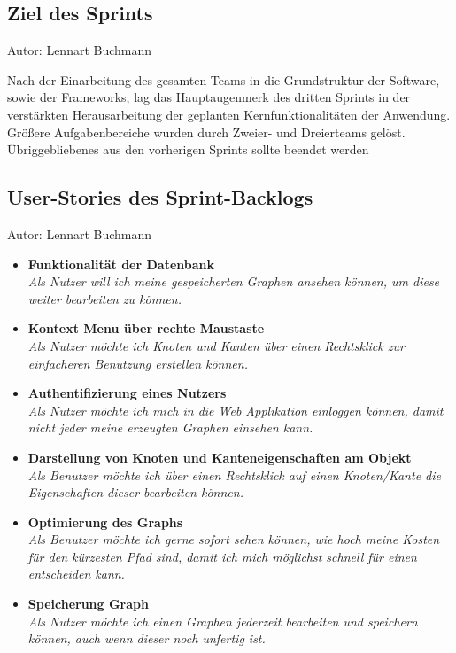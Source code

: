 
\subsection{Ziel des Sprints}
{\small Autor: Lennart Buchmann}

Nach der Einarbeitung des gesamten Teams in die Grundstruktur der Software, sowie der Frameworks, lag das Hauptaugenmerk des 
dritten Sprints in der verstärkten Herausarbeitung der geplanten Kernfunktionalitäten der Anwendung. Größere Aufgabenbereiche wurden 
durch Zweier- und Dreierteams gelöst. Übriggebliebenes aus den vorherigen Sprints sollte beendet werden 

\subsection{User-Stories des Sprint-Backlogs}
{\small Autor: Lennart Buchmann}

\begin{itemize}

  \item \textbf{Funktionalität der Datenbank}
        \\\textit{Als Nutzer will ich meine gespeicherten Graphen ansehen können, um diese weiter bearbeiten zu können.}
\item \textbf{Kontext Menu über rechte Maustaste}
        \\\textit{ Als Nutzer möchte ich Knoten und Kanten über einen Rechtsklick zur einfacheren Benutzung erstellen können.}
  \item \textbf{Authentifizierung eines Nutzers}
        \\\textit{Als Nutzer möchte ich mich in die Web Applikation einloggen können,
        damit nicht jeder meine erzeugten Graphen einsehen kann.}
  \item \textbf{Darstellung von Knoten und Kanteneigenschaften am Objekt}
        \\\textit{Als Benutzer möchte ich über einen Rechtsklick auf einen Knoten/Kante die Eigenschaften dieser bearbeiten können.}
  \item \textbf{Optimierung des Graphs}
        \\\textit{Als Benutzer möchte ich gerne sofort sehen können, wie hoch meine Kosten für den kürzesten Pfad sind, damit ich mich möglichst schnell für einen entscheiden kann.}
\item \textbf{Speicherung Graph}
        \\\textit{Als Nutzer möchte ich einen Graphen jederzeit bearbeiten und speichern können, auch wenn dieser noch unfertig ist.}

\end{itemize}


